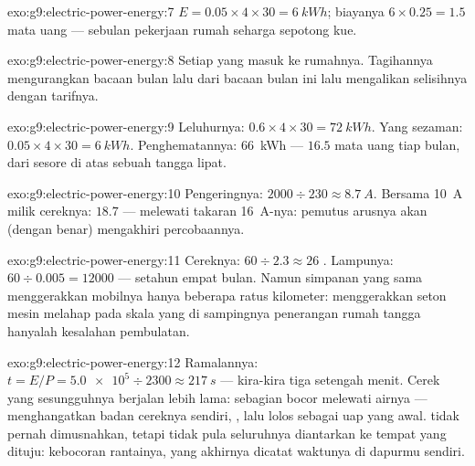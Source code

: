 \begin{solution}{exo:g9:electric-power-energy:7}
$E = 0.05 \times 4 \times 30 = \qty{6}{kWh}$; biayanya $6 \times
0.25 = 1.5$  mata uang --- sebulan pekerjaan rumah seharga
sepotong kue.
\end{solution}

\begin{solution}{exo:g9:electric-power-energy:8}
Setiap  yang masuk ke rumahnya. Tagihannya mengurangkan
bacaan bulan lalu dari bacaan bulan ini lalu mengalikan selisihnya
dengan tarifnya.
\end{solution}

\begin{solution}{exo:g9:electric-power-energy:9}
Leluhurnya: $0.6 \times 4 \times 30 = \qty{72}{kWh}$. Yang sezaman:
$0.05 \times 4 \times 30 = \qty{6}{kWh}$. Penghematannya:
\qty{66}{kWh} --- $16.5$  mata uang tiap bulan, dari sesore di
atas sebuah tangga lipat.
\end{solution}

\begin{solution}{exo:g9:electric-power-energy:10}
Pengeringnya: $2000 \div 230 \approx \qty{8.7}{A}$. Bersama
\qty{10}{A} milik cereknya: $18.7$ --- melewati takaran 
\qty{16}{A}-nya: pemutus arusnya akan (dengan benar) mengakhiri
percobaannya.
\end{solution}

\begin{solution}{exo:g9:electric-power-energy:11}
Cereknya: $60 \div 2.3 \approx 26$ . Lampunya: $60 \div
0.005 = 12000$  --- setahun empat bulan. Namun simpanan yang sama
menggerakkan mobilnya hanya beberapa ratus kilometer: menggerakkan
seton mesin melahap  pada skala yang di sampingnya penerangan
rumah tangga hanyalah kesalahan pembulatan.
\end{solution}

\begin{solution}{exo:g9:electric-power-energy:12}
Ramalannya: $t = E/P = \num{5.0e5} \div 2300 \approx
\qty{217}{s}$ --- kira-kira tiga setengah menit. Cerek yang
sesungguhnya berjalan lebih lama: sebagian  bocor melewati
airnya --- menghangatkan badan cereknya sendiri, , lalu lolos
sebagai uap yang awal.  tidak pernah dimusnahkan, tetapi tidak
pula seluruhnya diantarkan ke tempat yang dituju: kebocoran rantainya,
yang akhirnya dicatat waktunya di dapurmu sendiri.
\end{solution}

